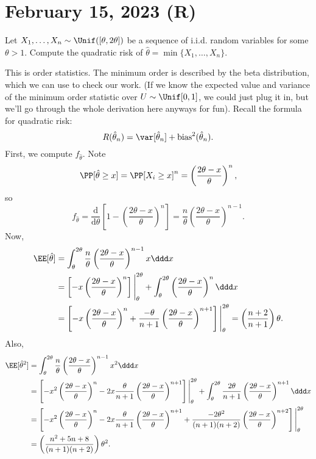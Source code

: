 \section{February 15, 2023 (R)}

\begin{example}
\exlabel

Let $X_1, \hdots, X_n\sim \Unif([\theta, 2\theta])$ be a sequence of i.i.d. random variables for some $\theta > 1$. Compute the quadratic risk of $\hat{\theta} = \min\{X_1, \hdots, X_n\}$.
\end{example}

This is order statistics. The minimum order is described by the \ac{beta distribution}, which we can use to check our work. (If we know the expected value and variance of the minimum order statistic over $U\sim \Unif[0,1]$, we could just plug it in, but we'll go through the whole derivation here anyways for fun). Recall the formula for quadratic risk: 
\[R(\hat{\theta}_n) = \var[\hat{\theta}_n] + \text{bias}^2(\hat{\theta}_n).\]
First, we compute $f_{\hat{\theta}}$. Note 
\[\PP[\hat{\theta}\geq x] = \PP[X_i\geq x]^n = \left(\frac{2\theta-x}{\theta}\right)^n,\]
so
\[f_{\hat{\theta}} = \frac{\mathrm{d}}{\mathrm{d}\theta}\left[1-\left(\frac{2\theta - x}{\theta}\right)^n\right] = \frac{n}{\theta}\left(\frac{2\theta-x}{\theta}\right)^{n-1}.\]
Now, 
\begin{align*}
    \EE[\hat{\theta}] &= \int_{\theta}^{2\theta}\frac{n}{\theta}\left(\frac{2\theta - x}{\theta}\right)^{n-1}x\ddd x\\
    &= \left[-x\left(\frac{2\theta-x}{\theta}\right)^n\right]\Bigg|_{\theta}^{2\theta} + \int_{\theta}^{2\theta}\left(\frac{2\theta-x}{\theta}\right)^n\ddd x \\
    &= \left[-x\left(\frac{2\theta-x}{\theta}\right)^n + \frac{-\theta}{n+1}\left(\frac{2\theta-x}{\theta}\right)^{n+1}\right]\Bigg|_{\theta}^{2\theta} = \left(\frac{n+2}{n+1}\right)\theta.
\end{align*}
Also,
\begin{align*}
    \EE[\hat{\theta}^2] &= \int_{\theta}^{2\theta}\frac{n}{\theta}\left(\frac{2\theta-x}{\theta}\right)^{n-1}x^2\ddd x \\
    &= \left[-x^2\left(\frac{2\theta-x}{\theta}\right)^n - 2x\frac{\theta}{n+1}\left(\frac{2\theta-x}{\theta}\right)^{n+1}\right]\Bigg|_{\theta}^{2\theta} + \int_{\theta}^{2\theta}\frac{2\theta}{n+1}\left(\frac{2\theta-x}{\theta}\right)^{n+1}\ddd x \\
    &= \left[-x^2\left(\frac{2\theta-x}{\theta}\right)^n - 2x\frac{\theta}{n+1}\left(\frac{2\theta-x}{\theta}\right)^{n+1} + \frac{-2\theta^2}{(n+1)(n+2)}\left(\frac{2\theta-x}{\theta}\right)^{n+2}\right]\Bigg|_{\theta}^{2\theta} \\
    &= \left(\frac{n^2+5n+8}{(n+1)(n+2)}\right)\theta^2.
\end{align*}
